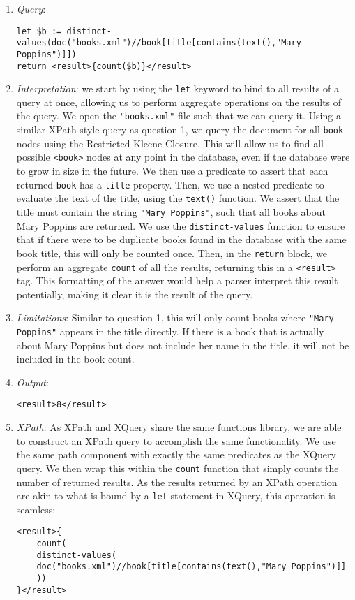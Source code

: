 \documentclass[11pt]{article}
\begin{document}
\begin{enumerate}
\item \textit{Query}:
\begin{small}
\begin{verbatim}
let $b := distinct-values(doc("books.xml")//book[title[contains(text(),"Mary Poppins")]])
return <result>{count($b)}</result>
\end{verbatim}
\end{small}
\item \textit{Interpretation}: we start by using the \texttt{let} keyword to bind to all results of a query at once, allowing us to perform aggregate operations on the results of the query. We open the \texttt{"books.xml"} file such that we can query it. Using a similar XPath style query as question 1, we query the document for all \texttt{book} nodes using the Restricted Kleene Closure. This will allow us to find all possible \texttt{<book>} nodes at any point in the database, even if the database were to grow in size in the future. We then use a predicate to assert that each returned \texttt{book} has a \texttt{title} property. Then, we use a nested predicate to evaluate the text of the title, using the \texttt{text()} function. We assert that the title must contain the string \texttt{"Mary Poppins"}, such that all books about Mary Poppins are returned. We use the \texttt{distinct-values} function to ensure that if there were to be duplicate books found in the database with the same book title, this will only be counted once. Then, in the \texttt{return} block, we perform an aggregate \texttt{count} of all the results, returning this in a \texttt{<result>} tag. This formatting of the answer would help a parser interpret this result potentially, making it clear it is the result of the query.

\item \textit{Limitations}: Similar to question 1, this will only count books where \texttt{"Mary Poppins"} appears in the title directly. If there is a book that is actually about Mary Poppins but does not include her name in the title, it will not be included in the book count.

\item \textit{Output}:
\begin{verbatim}
<result>8</result>
\end{verbatim} 
\item \textit{XPath}: As XPath and XQuery share the same functions library, we are able to construct an XPath query to accomplish the same functionality. We use the same path component with exactly the same predicates as the XQuery query. We then wrap this within the \texttt{count} function that simply counts the number of returned results. As the results returned by an XPath operation are akin to what is bound by a \texttt{let} statement in XQuery, this operation is seamless:
\begin{verbatim}
<result>{
    count(
    distinct-values(
    doc("books.xml")//book[title[contains(text(),"Mary Poppins")]]
    ))
}</result>
\end{verbatim}
\end{enumerate}
\end{document}
